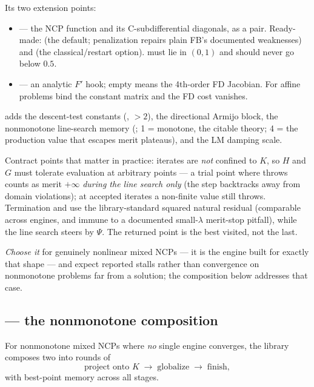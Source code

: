 Its two extension points:
\begin{itemize}
\item {} --- the NCP function and its
  C-subdifferential diagonals, as a pair. Ready-made:
   (the default;
  penalization repairs plain FB's documented weaknesses) and
   (the classical/restart option).
   must lie in $(0,1)$ and should never go below $0.5$.
\item {} --- an analytic $F'$ hook; empty means the 4th-order
  FD Jacobian. For affine problems bind the constant matrix and the FD cost
  vanishes.
\end{itemize}

 adds the descent-test constants (,
 $> 2$), the directional Armijo block, the nonmonotone
line-search memory (; 1 = monotone, the citable
theory; 4 = the production value that escapes merit plateaus), and the LM
damping scale.

Contract points that matter in practice: iterates are \emph{not} confined to
$K$, so $H$ and $G$ must tolerate evaluation at arbitrary points --- a trial
point where  throws counts as merit $+\infty$ \emph{during
the line search only} (the step backtracks away from domain violations); at
accepted iterates a non-finite value still throws. Termination and
 use the library-standard squared natural residual
(comparable across engines, and immune to a documented small-$\lambda$
merit-stop pitfall), while the line search steers by $\Psi$. The returned
point is the best visited, not the last.

\emph{Choose it} for genuinely nonlinear mixed NCPs --- it is the engine
built for exactly that shape --- and expect reported stalls rather than
convergence on nonmonotone problems far from a solution; the composition
below addresses that case.

\subsection{ --- the nonmonotone composition}
\label{sec:altchain}

For nonmonotone mixed NCPs where \emph{no} single engine converges, the
library composes two into rounds of
\[
  \text{project onto } K
  \;\longrightarrow\; \text{globalize}
  \;\longrightarrow\; \text{finish},
\]
with best-point memory across all stages.

